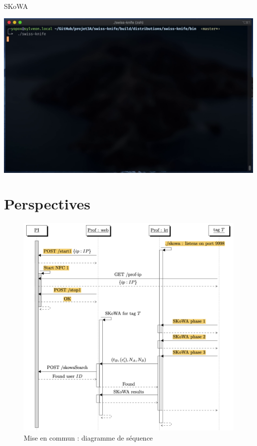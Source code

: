 \documentclass[aspectratio=169]{beamer}
\begin{document}
\begin{frame}{SKoWA}
  \begin{minipage}{.6\textwidth}
    \centering
    \includegraphics[width=\textwidth]{../assets/skowa-reader}
  \end{minipage}
\end{frame}

\section{Perspectives}

\begin{frame}
  \begin{figure}
    \centering
    \includegraphics[height=.9\textheight]{../assets/seq.png}
    \captionsetup{labelformat=empty}
    \caption{Mise en commun : diagramme de séquence}
  \end{figure}
\end{frame}
\end{document}
